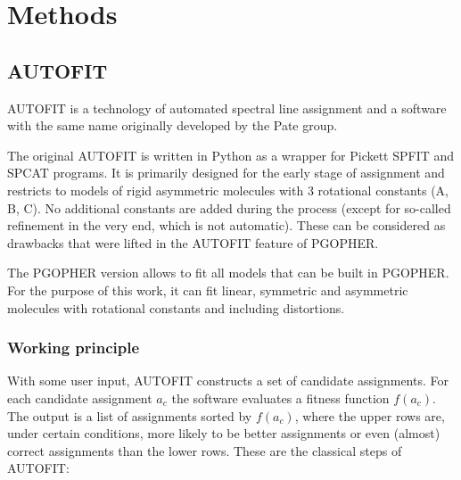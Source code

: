 \documentclass[11pt]{article}
\begin{document}
\section{Methods}


\subsection{AUTOFIT}

AUTOFIT is a technology of automated spectral line assignment and a software with the same name originally developed by the Pate group. 

The original AUTOFIT is written in Python as a wrapper for Pickett SPFIT and SPCAT programs. It is primarily designed for the early stage of assignment and restricts to models of rigid asymmetric molecules with 3 rotational constants (A, B, C).  No additional constants are added during the process (except for so-called refinement in the very end, which is not automatic). These can be considered as drawbacks that were lifted in the AUTOFIT feature of PGOPHER. 

The PGOPHER version allows to fit all models that can be built in PGOPHER. For the purpose of this work, it can fit linear, symmetric and asymmetric molecules with rotational constants and including distortions.

\subsubsection{Working principle}

With some user input, AUTOFIT constructs a set of candidate assignments. For each candidate assignment $a_c$ the software evaluates a fitness function $f(a_c)$. The output is a list of assignments sorted by $f(a_c)$, where the upper rows are, under certain conditions, more likely to be better assignments or even (almost) correct assignments than the lower rows. These are the classical steps of AUTOFIT:
\end{document}
